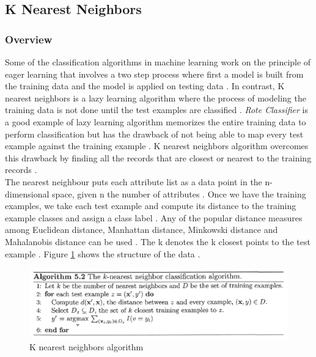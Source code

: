 \documentclass[sigconf]{acmart}
\begin{document}
\subsection{K Nearest Neighbors}

\subsubsection{Overview} Some of the classification algorithms in machine learning work on the principle of eager learning that involves a two step process where first a model is built from the training data and the model is applied on testing data \cite{book-tan}. In contrast, K nearest neighbors is a lazy learning algorithm where the process of modeling the training data is not done until the test examples are classified \cite{book-tan}. {\em Rote Classifier} is a good example of lazy learning algorithm memorizes the entire training data to perform classification but has the drawback of not being able to map every test example against the training example \cite{book-tan}. K nearest neighbors algorithm overcomes this drawback by finding all the records that are closest or nearest to the training records \cite{book-tan}. \\

The nearest neighbour puts each attribute list as a data point in the n-dimensional space, given n the number of attributes \cite{book-tan}. Once we have the training examples, we take each test example and compute its distance to the training example classes and assign a class label \cite{book-tan}. Any of the popular distance measures among Euclidean distance, Manhattan distance, Minkowski distance and Mahalanobis distance can be used \cite{book-tan}. The k denotes the k closest points to the test example \cite{book-tan}. Figure \ref{fig:Fig1} shows the structure of the data \cite{book-tan}.

\begin{figure}
\includegraphics[width=1.0\textwidth]{images/fig1.png}
\caption{K nearest neighbors algorithm\cite{book-tan}}
\label{fig:Fig1}
\end{figure}
\end{document}
